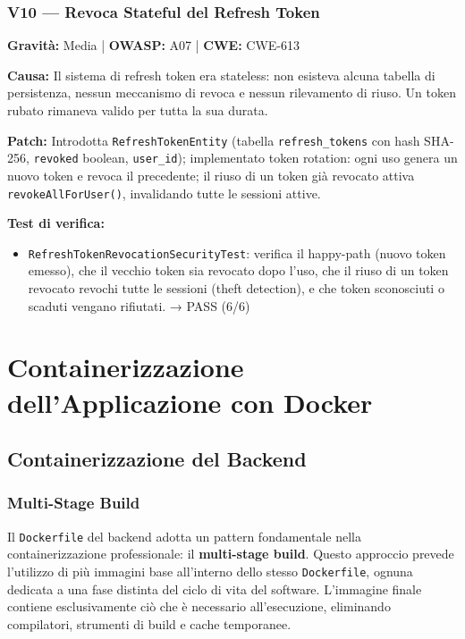 \documentclass[12pt, a4paper]{article}
\begin{document}
    \subsubsection{V10 — Revoca Stateful del Refresh Token}

    \textbf{Gravità:} Media | \textbf{OWASP:} A07 | \textbf{CWE:} CWE-613

    \textbf{Causa:} Il sistema di refresh token era stateless: non esisteva alcuna tabella
    di persistenza, nessun meccanismo di revoca e nessun rilevamento di riuso. Un token
    rubato rimaneva valido per tutta la sua durata.

    \textbf{Patch:} Introdotta \texttt{RefreshTokenEntity} (tabella \texttt{refresh\_tokens}
    con hash SHA-256, \texttt{revoked} boolean, \texttt{user\_id}); implementato token rotation:
    ogni uso genera un nuovo token e revoca il precedente; il riuso di un token già revocato
    attiva \texttt{revokeAllForUser()}, invalidando tutte le sessioni attive.

    \textbf{Test di verifica:}
    \begin{itemize}
        \item \texttt{RefreshTokenRevocationSecurityTest}: verifica il happy-path (nuovo token
        emesso), che il vecchio token sia revocato dopo l'uso, che il riuso di un token revocato
        revochi tutte le sessioni (theft detection), e che token sconosciuti o scaduti vengano
        rifiutati. → \checkmark{} PASS (6/6)
    \end{itemize}


    \section{Containerizzazione dell'Applicazione con Docker}
    \label{sec:docker}

    \subsection{Containerizzazione del Backend}

    \subsubsection{Multi-Stage Build}

    Il \texttt{Dockerfile} del backend adotta un pattern fondamentale nella containerizzazione
    professionale: il \textbf{multi-stage build}. Questo approccio prevede l'utilizzo di più
    immagini base all'interno dello stesso \texttt{Dockerfile}, ognuna dedicata a una fase
    distinta del ciclo di vita del software. L'immagine finale contiene esclusivamente ciò che
    è necessario all'esecuzione, eliminando compilatori, strumenti di build e cache temporanee.
\end{document}
